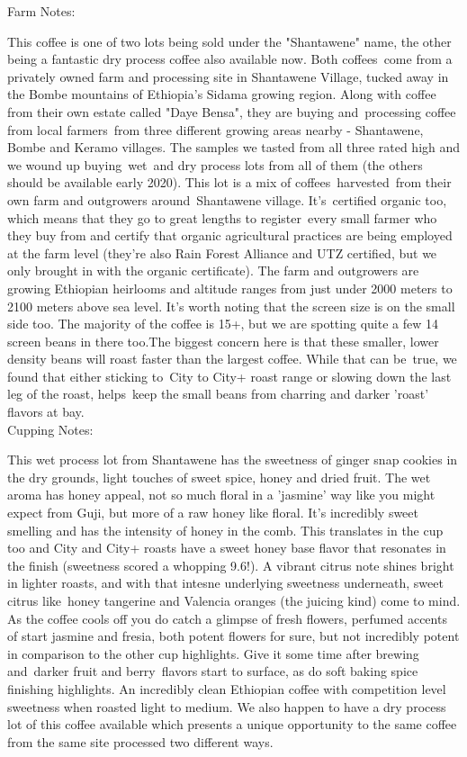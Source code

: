 \documentclass[10pt,twoside,footinclude=true,headinclude=true]{scrbook} %
\newlength{\mysize}
\newcommand{\myfontsize}[1]{
  \setlength{\mysize}{#1pt}
  \fontsize{\mysize}{1.2\mysize}
  \selectfont
}
\begin{document}
\newpage
\vspace*{-2.2em}
\raggedright
\normalsize
Farm Notes: \\
\myfontsize{8}
This coffee is one of two lots being sold under the "Shantawene" name, the other being a fantastic dry process coffee also available now. Both coffees come from a privately owned farm and processing site in Shantawene Village, tucked away in the Bombe mountains of Ethiopia's Sidama growing region. Along with coffee from their own estate called "Daye Bensa", they are buying and processing coffee from local farmers from three different growing areas nearby - Shantawene, Bombe and Keramo villages. The samples we tasted from all three rated high and we wound up buying wet and dry process lots from all of them (the others should be available early 2020). This lot is a mix of coffees harvested from their own farm and outgrowers around Shantawene village. It's certified organic too, which means that they go to great lengths to register every small farmer who they buy from and certify that organic agricultural practices are being employed at the farm level (they're also Rain Forest Alliance and UTZ certified, but we only brought in with the organic certificate). The farm and outgrowers are growing Ethiopian heirlooms and altitude ranges from just under 2000 meters to 2100 meters above sea level. It's worth noting that the screen size is on the small side too. The majority of the coffee is 15+, but we are spotting quite a few 14 screen beans in there too.The biggest concern here is that these smaller, lower density beans will roast faster than the largest coffee. While that can be true, we found that either sticking to City to City+ roast range or slowing down the last leg of the roast, helps keep the small beans from charring and darker 'roast' flavors at bay. \\
\medskip
\normalsize
Cupping Notes: \\
\myfontsize{8}
This wet process lot from Shantawene has the sweetness of ginger snap cookies in the dry grounds, light touches of sweet spice, honey and dried fruit. The wet aroma has honey appeal, not so much floral in a 'jasmine' way like you might expect from Guji, but more of a raw honey like floral. It's incredibly sweet smelling and has the intensity of honey in the comb. This translates in the cup too and City and City+ roasts have a sweet honey base flavor that resonates in the finish (sweetness scored a whopping 9.6!). A vibrant citrus note shines bright in lighter roasts, and with that intesne underlying sweetness underneath, sweet citrus like honey tangerine and Valencia oranges (the juicing kind) come to mind. As the coffee cools off you do catch a glimpse of fresh flowers, perfumed accents of start jasmine and fresia, both potent flowers for sure, but not incredibly potent in comparison to the other cup highlights. Give it some time after brewing and darker fruit and berry flavors start to surface, as do soft baking spice finishing highlights. An incredibly clean Ethiopian coffee with competition level sweetness when roasted light to medium. We also happen to have a dry process lot of this coffee available which presents a unique opportunity to the same coffee from the same site processed two different ways.  \\
\end{document}
